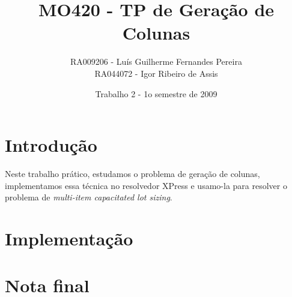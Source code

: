 \documentclass[letterpaper,11pt]{article}
\title{MO420 - TP de Geração de Colunas}
\author{RA009206 - Luís Guilherme Fernandes Pereira \\
RA044072 - Igor Ribeiro de Assis}
\date{Trabalho 2 - 1o semestre de 2009}
\begin{document}
\maketitle

\section{Introdução}

Neste trabalho prático, estudamos o problema de geração de colunas,
implementamos essa técnica no resolvedor XPress e usamo-la para resolver
o problema de \emph{multi-item capacitated lot sizing}.

\section{Implementação}


\section{Nota final}



\end{document}

